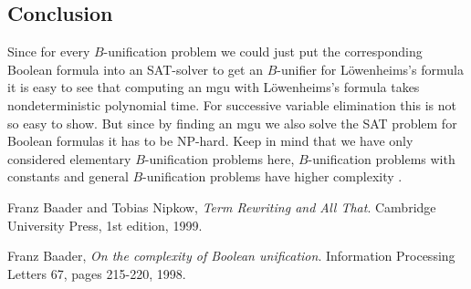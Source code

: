 		\subsection{Conclusion}
		Since for every $B$-unification problem we could just put the corresponding Boolean formula into an SAT-solver to get an $B$-unifier for Löwenheims's formula it is easy to see that computing an mgu with Löwenheims's formula takes nondeterministic polynomial time. For successive variable elimination this is not so easy to show. But since by finding an mgu we also solve the SAT problem for Boolean formulas it has to be NP-hard. Keep in mind that we have only considered elementary $B$-unification problems here, $B$-unification problems with constants and general $B$-unification problems have higher complexity \cite{cmplxBU}.
		\begin{thebibliography}{9}
		
		  Franz Baader and Tobias Nipkow,
		  \emph{Term Rewriting and All That}.
		  Cambridge University Press,
		  1st edition,
		  1999.
		
			Franz Baader,
			\emph{On the complexity of Boolean unification}.
		 	Information Processing Letters 67,
		 	pages 215-220,
		 	1998.
		
		\end{thebibliography}